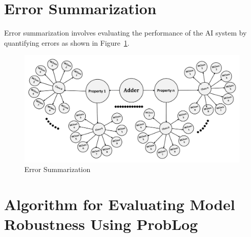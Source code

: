 \section{Error Summarization}

Error summarization involves evaluating the performance of the AI system by quantifying errors as shown in Figure~\ref{Summarization}.

\begin{figure}[h]
    \centering
    \includegraphics[width=\textwidth]{figures/step5.pdf}
    \caption{Error Summarization}
    \label{Summarization}
\end{figure}



\section{Algorithm for Evaluating Model Robustness Using ProbLog}

